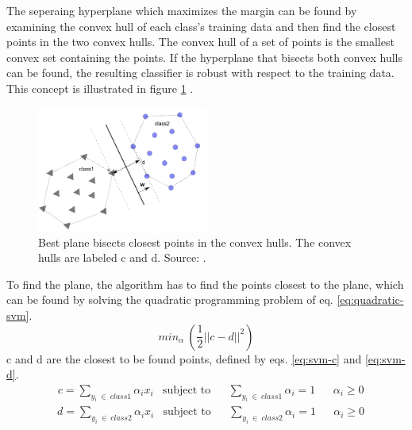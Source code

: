 The seperaing hyperplane which maximizes the margin can be found by examining 
the convex hull of each class’s training data and then find the closest points 
in the two convex hulls. The convex hull of a set of points is the
smallest convex set containing the points. If the hyperplane that bisects both 
convex hulls can be found, the resulting classifier is robust with
respect to the training data.
This concept is illustrated in figure \ref{fig:convex_hull} \citep{convexhull}.
\begin{figure}[ht]
\centering
\includegraphics[width = 0.5\textwidth]{img/convex_hull.png}
\caption[Best plane bisects closest points in the convex hulls]
{Best plane bisects closest points in the convex hulls. The convex hulls 
are labeled c and d. Source: \citep{convexhull}.}
\label{fig:convex_hull}
\end{figure}  

To find the plane, the algorithm has to find the points closest
to the plane, which can 
be found by solving the quadratic programming problem of eq. \eqref{eq:quadratic-svm}.
\begin{equation}
min_\alpha~\left(\frac{1}{2} ||c-d||^2\right)
\label{eq:quadratic-svm}
\end{equation}
c and d are the closest to be found points,
defined by eqs. \eqref{eq:svm-c} and \eqref{eq:svm-d}.
\begin{equation}
\begin{aligned}
&c = \sum_{y_i~\in~class1} \alpha_ix_i  
& \text{subject to}
&& \sum_{y_i~\in~class1}\alpha_i =1 
&& \alpha_i \geq 0
\end{aligned}
\label{eq:svm-c} 
\end{equation}
\begin{equation}
\begin{aligned}
&d = \sum_{y_i~\in~class2} \alpha_ix_i  
& \text{subject to}
&& \sum_{y_i~\in~class2}\alpha_i =1 
&& \alpha_i \geq 0
\end{aligned} 
\label{eq:svm-d} 
\end{equation}

